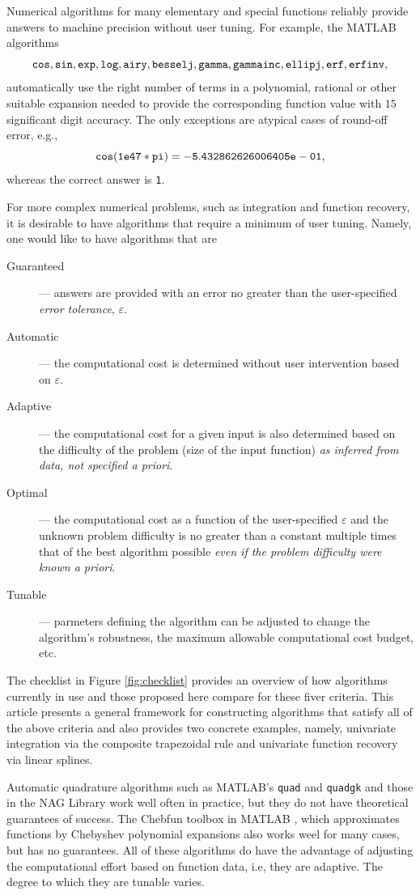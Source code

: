 \documentclass[]{elsarticle}
\theoremstyle{definition}
\theoremstyle{remark}
\begin{document}
Numerical algorithms for many elementary and special functions reliably provide answers to machine precision without user tuning.  For example, the MATLAB \cite{MAT7.12} algorithms
\[
{\tt cos, sin, exp, log, airy, besselj, gamma, gammainc, ellipj, erf, erfinv,}
\] 
automatically use the right number of terms in a polynomial, rational or other suitable expansion needed to provide the corresponding function value with $15$ significant digit accuracy. The only exceptions are atypical cases of round-off error, e.g., 
\[
{\tt cos(1e47*pi)= -5.432862626006405e-01},
\]
whereas the correct answer is {\tt 1}.

For more complex numerical problems, such as integration and function recovery, it is desirable to have algorithms that require a minimum of user tuning.  Namely, one would like to have algorithms that are
\begin{description}
\item[Guaranteed]---  answers are provided with an error no greater than the user-specified \emph{error tolerance}, $\varepsilon$.
\item[Automatic]--- the computational cost is determined without user intervention based on $\varepsilon$.
\item[Adaptive]--- the computational cost for a given input is also determined based on the difficulty of the problem (size of the input function) \emph{as inferred from data, not specified a priori}.
\item[Optimal]--- the computational cost as a function of the user-specified $\varepsilon$ and the unknown problem difficulty is no greater than a constant multiple times that of the best algorithm possible \emph{even if the problem difficulty were known a priori}.
\item[Tunable]--- parmeters defining the algorithm can be adjusted to change the algorithm's robustness, the maximum allowable computational cost budget, etc.
\end{description}
The checklist in Figure \ref{fig:checklist} provides an overview of how algorithms currently in use and those proposed here compare for these fiver criteria.  This article presents a general framework for constructing  algorithms that satisfy all of the above criteria and also provides two concrete examples, namely, univariate integration via the composite trapezoidal rule and univariate function recovery via linear splines.

Automatic quadrature algorithms such as MATLAB's {\tt quad} and {\tt quadgk} \cite{MAT7.12} and those in the NAG Library \cite{NAG23} work well often in practice, but they do not have theoretical guarantees of success.  The Chebfun toolbox in MATLAB \cite{TrefEtal12}, which approximates functions by Chebyshev polynomial expansions also works weel for many cases, but has no guarantees.  All of these algorithms do have the advantage of adjusting the computational effort based on function data, i.e, they are adaptive.  The degree to which they are tunable varies.
\end{document}
